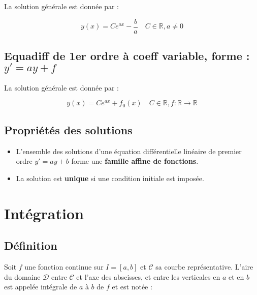 \documentclass{report}
\begin{document}
        La solution générale est donnée par :

          \[
          \boxed{y(x) = C e^{a x} - \dfrac{b}{a}} \quad C \in \mathbb{R} , a \ne 0
          \]

        \iffalse\paragraph{Cas particulier $a = 0$ :}
        \[
        y' = b \Rightarrow y = bx + C
        \]\fi

        \subsection{Equadiff de 1er ordre à coeff variable, forme :  $y' = a y + f$}

        La solution générale est donnée par :

          \[
          \boxed{y(x) = C e^{a x} + f_0(x)} \quad C \in \mathbb{R} , f : \mathbb{R} \to \mathbb{R}
          \]



      \subsection{Propriétés des solutions}

        \begin{itemize}
          \item L'ensemble des solutions d'une équation différentielle linéaire de premier ordre $y' = a y + b$ forme une \textbf{famille affine de fonctions}.
          \item La solution est \textbf{unique} si une condition initiale est imposée.
        \end{itemize}





    \newpage

    \section{Intégration}

    \subsection{Définition}

    Soit \( f \) une fonction continue sur \( I = [a, b] \) et \( \mathcal{C} \) sa courbe représentative. L'aire du domaine \( \mathcal{D} \) entre \( \mathcal{C} \) et l'axe des abscisses, et entre les verticales en \( a \) et en \( b \) est appelée intégrale de \( a \) à \( b \) de \( f \) et est notée :
\end{document}
